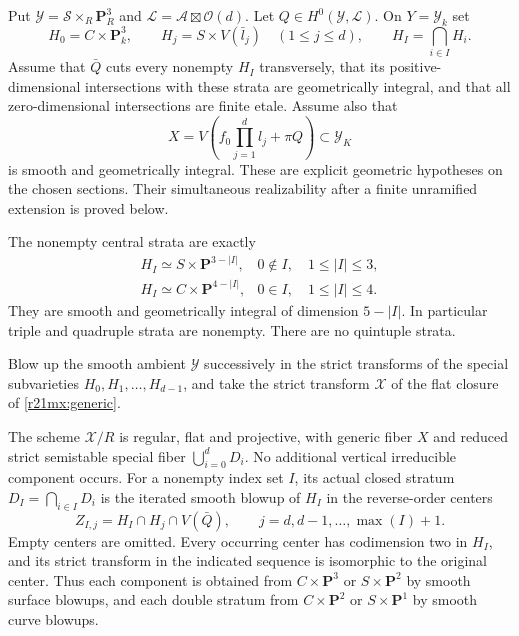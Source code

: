 Put $\mathcal Y=\mathcal S\times_R\mathbf P_R^3$ and
$\mathcal L=\mathcal A\boxtimes\mathcal O(d)$.  Let
$Q\in H^0(\mathcal Y,\mathcal L)$.  On $Y=\mathcal Y_k$ set
\[
 H_0=C\times\mathbf P_k^3,\qquad
 H_j=S\times V(\bar l_j)\quad(1\le j\le d),
 \qquad H_I=\bigcap_{i\in I}H_i.
 \tag{MX21.1}\label{r21mx:central}
\]
Assume that $\bar Q$ cuts every nonempty $H_I$ transversely, that
its positive-dimensional intersections with these strata are
geometrically integral, and that all zero-dimensional intersections
are finite etale.  Assume also that
\[
 X=V\left(f_0\prod_{j=1}^d l_j+\pi Q\right)
                         \subset\mathcal Y_K
 \tag{MX21.2}\label{r21mx:generic}
\]
is smooth and geometrically integral.  These are explicit geometric
hypotheses on the chosen sections.  Their simultaneous realizability
after a finite unramified extension is proved below.

The nonempty central strata are exactly
\[
 \begin{array}{ll}
 H_I\simeq S\times\mathbf P^{3-|I|},
       &0\notin I,\quad1\le |I|\le3,\\[2pt]
 H_I\simeq C\times\mathbf P^{4-|I|},
       &0\in I,\quad1\le |I|\le4.
 \end{array}
 \tag{MX21.3}\label{r21mx:strata}
\]
They are smooth and geometrically integral of dimension $5-|I|$.
In particular triple and quadruple strata are nonempty.  There are
no quintuple strata.

Blow up the smooth ambient $\mathcal Y$ successively in the strict
transforms of the special subvarieties $H_0,H_1,\ldots,H_{d-1}$,
and take the strict transform $\mathcal X$ of the flat closure of
\eqref{r21mx:generic}.

\begin{proposition}
\label{r21mx:resolution}
The scheme $\mathcal X/R$ is regular, flat and projective, with
generic fiber $X$ and reduced strict semistable special fiber
$\bigcup_{i=0}^dD_i$.  No additional vertical irreducible component
occurs.  For a nonempty index set $I$, its actual closed stratum
$D_I=\bigcap_{i\in I}D_i$ is the iterated smooth blowup of $H_I$ in
the reverse-order centers
\[
          Z_{I,j}=H_I\cap H_j\cap V(\bar Q),
                    \qquad j=d,d-1,\ldots,\max(I)+1.
 \tag{MX21.4}\label{r21mx:centers}
\]
Empty centers are omitted.  Every occurring center has codimension
two in $H_I$, and its strict transform in the indicated sequence is
isomorphic to the original center.  Thus each component is obtained
from $C\times\mathbf P^3$ or $S\times\mathbf P^2$ by smooth surface
blowups, and each double stratum from $C\times\mathbf P^2$ or
$S\times\mathbf P^1$ by smooth curve blowups.
\end{proposition}

